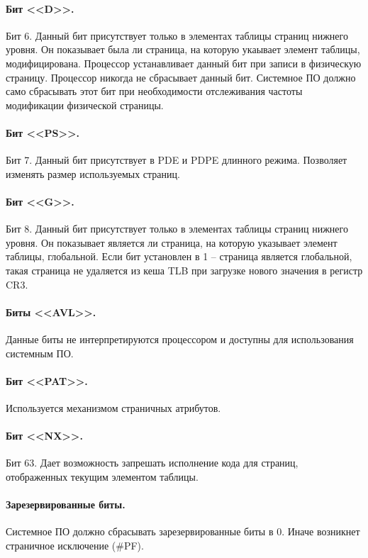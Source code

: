 \paragraph{Бит <<D>>.} Бит 6. Данный бит присутствует только в элементах таблицы страниц нижнего уровня. Он показывает была ли
страница, на которую укаывает элемент таблицы, модифицирована. Процессор устанавливает данный бит при записи в
физическую страницу. Процессор никогда не сбрасывает данный бит. Системное ПО должно само сбрасывать этот бит
при необходимости отслеживания частоты модификации физической страницы.

\paragraph{Бит <<PS>>.} Бит 7. Данный бит присутствует в PDE и PDPE длинного режима.
Позволяет изменять размер используемых страниц.

\paragraph{Бит <<G>>.} Бит 8. Данный бит присутствует только в элементах таблицы страниц нижнего уровня. Он показывает является
ли страница, на которую указывает элемент таблицы, глобальной. Если бит установлен в 1 -- страница является
глобальной, такая страница не удаляется из кеша TLB при загрузке нового значения в регистр CR3.

\paragraph{Биты <<AVL>>.} Данные биты не интерпретируются процессором и доступны для использования системным ПО.

\paragraph{Бит <<PAT>>.} Используется механизмом страничных атрибутов.

\paragraph{Бит <<NX>>.} Бит 63. Дает возможность запрешать исполнение кода для страниц, отображенных текущим элементом таблицы.

\paragraph{Зарезервированные биты.} Системное ПО должно сбрасывать зарезервированные биты в 0. Иначе возникнет
страничное исключение (\#PF).

